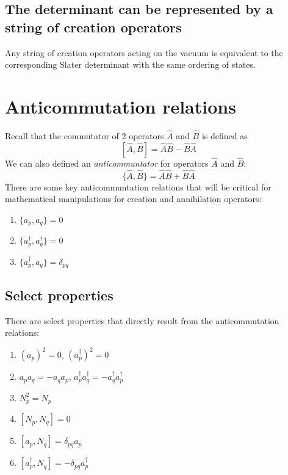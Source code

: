 \documentclass{article}
\begin{document}
\subsection{The determinant can be represented by a string of creation operators}

Any string of creation operators acting on the vacuum is equivalent to the corresponding Slater determinant with the same ordering of states. 

\section{Anticommutation relations}

Recall that the commutator of 2 operators $\hat{A}$ and $\hat{B}$ is defined as
\[ [\hat{A}, \hat{B} ] = \hat{A}\hat{B} - \hat{B}\hat{A} \]
We can also defined an \textit{anticommuntator} for operators $\hat{A}$ and $\hat{B}$:
\[ \{\hat{A}, \hat{B} \} = \hat{A}\hat{B} + \hat{B}\hat{A} \]
There are some key anticommuntation relations that will be critical for mathematical manipulations for creation and annihilation operators:
\begin{enumerate}
\item  $\{a_p, a_q\} = 0$
\item $\{a_p^\dagger, a_q^\dagger \} = 0$
\item $\{a_p^\dagger, a_q\} = \delta_{pq}$
\end{enumerate}

\subsection{Select properties}
There are select properties that directly result from the anticommutation relations: 
\begin{enumerate}
\item $(a_p)^2 = 0$, $(a_p^\dagger)^2 = 0$
\item $a_pa_q = -a_qa_p$,  $a_p^\dagger a_q^\dagger = -a_q^\dagger a_p^\dagger$
\item$ N_p^2 = N_p$
\item $[N_p, N_q] = 0$
\item $[a_p, N_q] = \delta_{pq}a_p$
\item $[a_p^\dagger, N_q] = -\delta_{pq}a_p^\dagger$
\end{enumerate}
\end{document}
